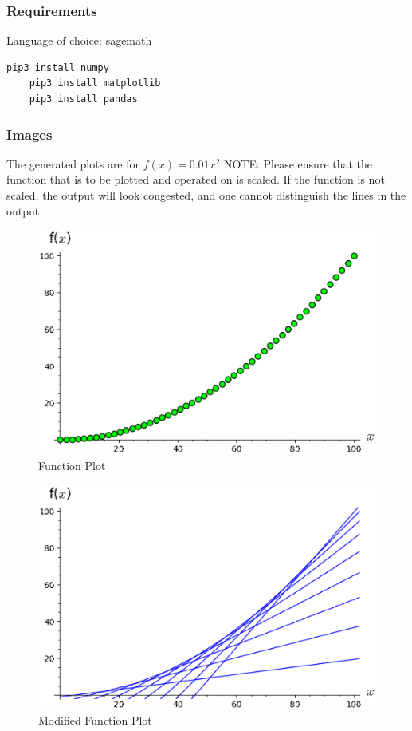 \subsubsection{Requirements}
Language of choice: sagemath
\begin{lstlisting}[language=bash]
	pip3 install numpy
	pip3 install matplotlib
	pip3 install pandas
\end{lstlisting}

\subsubsection{Images}
The generated plots are for $f(x)=0.01x^2$
NOTE: Please ensure that the function that is to be plotted and operated on is scaled. If the function is not scaled, the output will look congested, and one cannot distinguish the lines in the output.

\begin{figure}[!ht]
	\includegraphics{question_6/Plotted.eps} 
	\caption{Function Plot}
\end{figure} 

\begin{figure}[!ht]
	\includegraphics{question_6/Tangents.eps} 
	\caption{Modified Function Plot}
\end{figure} 

